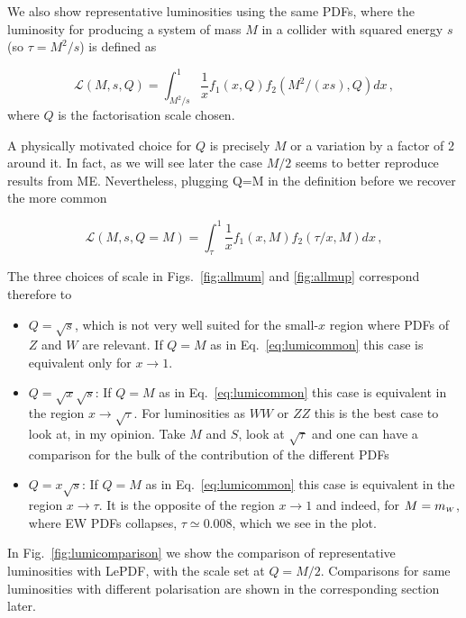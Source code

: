 \documentclass[a4paper,11pt]{article}
\begin{document}
We also show representative luminosities using the same PDFs, where the luminosity for producing a system of mass $M$ in a collider with squared energy $s$ (so $\tau=M^2/s$) is defined as

\begin{equation}
\mathcal L(M,s,Q)=\int_{M^2/s}^1 \frac{1}{x} f_1(x,Q) f_2(M^2/(x s),Q) dx\, ,
\end{equation}
where $Q$ is the factorisation scale chosen.

A physically motivated choice for $Q$ is precisely $M$ or a variation by a factor of 2 around it. In fact, as we will see later the case $M/2$ seems to better reproduce results from ME. Nevertheless, plugging Q=M in the definition before we recover the more common

\begin{equation}
\mathcal L(M,s,Q=M)=\int_{\tau}^1 \frac{1}{x} f_1(x,M) f_2(\tau/x,M) dx\, , \label{eq:lumicommon}
\end{equation}

The three choices of scale in Figs.~\ref{fig:allmum} and \ref{fig:allmup} correspond therefore to 

\begin{itemize}
\item $Q=\sqrt{s}$, which is not very well suited for the small-$x$ region where PDFs of $Z$ and $W$ are relevant. If $Q=M$ as in Eq.~\eqref{eq:lumicommon} this case is equivalent only for $x\to 1$.
\item$Q=\sqrt{x} \sqrt{s}$: If $Q=M$ as in Eq.~\eqref{eq:lumicommon} this case is equivalent in the region $x\to \sqrt{\tau}$. For luminosities as $WW$ or $ZZ$ this is the best case to look at, in my opinion. Take $M$ and $S$, look at $\sqrt{\tau}$ and one can have a comparison for the bulk of the contribution of the different PDFs
\item $Q=x \sqrt{s}$: If $Q=M$ as in Eq.~\eqref{eq:lumicommon} this case is equivalent in the region $x \to \tau$. It is the opposite of the region $x\to 1$ and indeed, for $M=m_{\scriptscriptstyle W}$, where EW PDFs collapses, $\tau \simeq 0.008$, which we see in the plot.    
\end{itemize}


In Fig.~\ref{fig:lumicomparison} we show the comparison of representative luminosities with {\small \sc LePDF}, with the scale set at $Q=M/2$.
Comparisons for same luminosities with different polarisation are shown in the corresponding section later.


\end{document}
